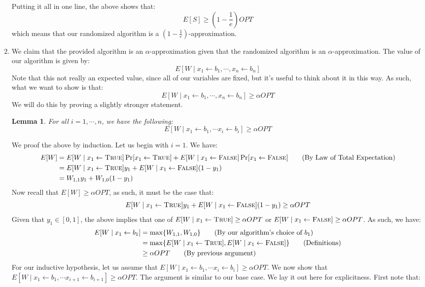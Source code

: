 \documentclass[12pt]{exam}
\newtheorem{lemma}[theorem]{Lemma}
\begin{document}
\begin{questions}
\begin{solution}
\begin{enumerate}[label=(\alph*)]
      Putting it all in one line, the above shows that:
      \[
        E[S] \geq \left( 1 - \frac{1}{e}\right) OPT
      \]
      which means that our randomized algorithm is a $(1 - \frac{1}{e})$-approximation.
    \item
      We claim that the provided algorithm is an $\alpha$-approximation given that the randomized algorithm is an $\alpha$-approximation. The value of our algorithm is given by:
      \[ 
        E[W \mid x_1 \gets b_1, \cdots, x_n \gets b_n]
      \]
      Note that this not really an expected value, since all of our variables are fixed, but it's useful to think about it in this way. As such, what we want to show is that:
      \[
        E[W \mid x_1 \gets b_1, \cdots, x_n \gets b_n] \geq \alpha OPT
      \]
      We will do this by proving a slightly stronger statement.
      \begin{lemma}
        For all $i = 1, \cdots, n$, we have the following:
          \[
            E[W \mid x_1 \gets b_1, \cdots x_i \gets b_i] \geq \alpha OPT
          \]
      \end{lemma}
      We proof the above by induction. Let us begin with $i = 1$. We have:
      \begin{align*}
        E[W] &= E[W \mid x_1 \gets \textsc{True} ]\Pr[x_1 \gets \textsc{True}] + E[W \mid x_1 \gets \textsc{False} ]\Pr[x_1 \gets \textsc{False}] \tag{By Law of Total Expectation} \\
        &= E[W \mid x_1 \gets \textsc{True} ]y_1 + E[W \mid x_1 \gets \textsc{False} ](1-y_1) \\
        &= W_{1,1} y_1 + W_{1,0} (1-y_1)
      \end{align*}
      Now recall that $E[W] \geq \alpha OPT$, as such, it must be the case that:
      \[
        E[W \mid x_1 \gets \textsc{True} ]y_1 + E[W \mid x_1 \gets \textsc{False} ](1-y_1) \geq \alpha OPT
      \]
      Given that $y_1 \in [0,1]$, the above implies that one of $E[W \mid x_1 \gets \textsc{True}] \geq \alpha OPT$ or $E[W \mid x_1 \gets \textsc{False} ] \geq \alpha OPT$. As such, we have:
      \begin{align*}
        E[W \mid x_1 \gets b_1] &= \max\{ W_{1,1}, W_{1,0} \} \tag{By our algorithm's choice of $b_1$} \\
        &= \max\{ E[W \mid x_1 \gets \textsc{True}], E[W \mid x_1 \gets \textsc{False}] \} \tag{Definitions} \\
        &\geq \alpha OPT \tag{By previous argument}
      \end{align*}
      For our inductive hypothesis, let us assume that $E[W \mid x_1 \gets b_1, \cdots x_i \gets b_i] \geq \alpha OPT$. We now show that $E[W \mid x_1 \gets b_1, \cdots x_{i+1} \gets b_{i+1}] \geq \alpha OPT$. The argument is similar to our base case. We lay it out here for explicitness. First note that:


\end{enumerate}
\end{solution}
\end{questions}
\end{document}
